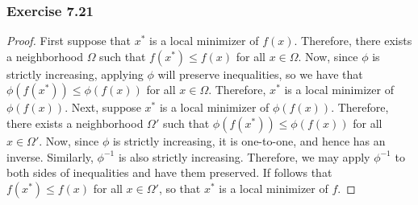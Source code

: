 \documentclass[letterpaper,12pt]{article}
\theoremstyle{definition}
\begin{document}
\subsubsection*{Exercise 7.21}
\begin{proof}
	First suppose that $x^*$ is a local minimizer of $f(x)$. Therefore, there exists a neighborhood $\Omega$ such that $f(x^*) \leq f(x)$ for all $x \in \Omega$. Now, since $\phi$ is strictly increasing, applying $\phi$ will preserve inequalities, so we have that $\phi(f(x^*)) \leq \phi(f(x))$ for all $x \in \Omega$. Therefore, $x^*$ is a local minimizer of $\phi(f(x))$. Next, suppose $x^*$ is a local minimizer of $\phi(f(x))$. Therefore, there exists a neighborhood $\Omega'$ such that $\phi(f(x^*)) \leq \phi(f(x))$ for all $x \in \Omega'$. Now, since $\phi$ is strictly increasing, it is one-to-one, and hence has an inverse. Similarly, $\phi^{-1}$ is also strictly increasing. Therefore, we may apply $\phi^{-1}$ to both sides of inequalities and have them preserved. If follows that $f(x^*) \leq f(x)$ for all $x \in \Omega'$, so that $x^*$ is a local minimizer of $f$.
\end{proof}
\end{document}
